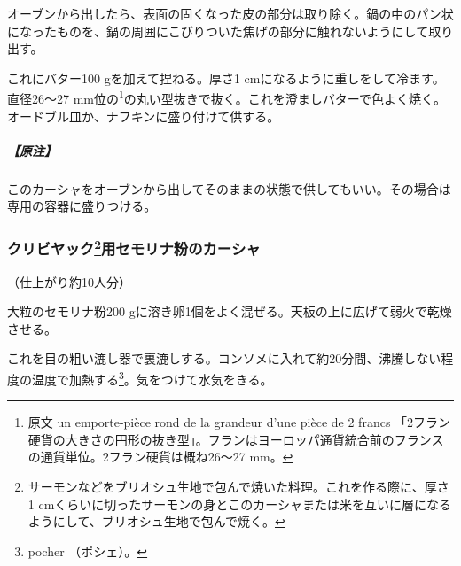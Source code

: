 \begin{recette}
オーブンから出したら、表面の固くなった皮の部分は取り除く。鍋の中のパン状になったものを、鍋の周囲にこびりついた焦げの部分に触れないようにして取り出す。

これにバター100 gを加えて捏ねる。厚さ1
cmになるように重しをして冷ます。直径26〜27 mm位の\footnote{原文 un
  emporte-pièce rond de la grandeur d'une pièce de 2 francs
  「2フラン硬貨の大きさの円形の抜き型」。フランはヨーロッパ通貨統合前のフランスの通貨単位。2フラン硬貨は概ね26〜27
  mm。}の丸い型抜きで抜く。これを澄ましバターで色よく焼く。オードブル皿か、ナフキンに盛り付けて供する。

\hypertarget{nota-kache-de-sarrazin-pour-potage}{%
\subparagraph{【原注】}\label{nota-kache-de-sarrazin-pour-potage}}

このカーシャをオーブンから出してそのままの状態で供してもいい。その場合は専用の容器に盛りつける。

\atoaki{}

\hypertarget{kache-de-semoule-pour-coulibiac}{%
\subsubsection[クリビヤック用セモリナ粉のカーシャ]{\texorpdfstring{クリビヤック\footnote{サーモンなどをブリオシュ生地で包んで焼いた料理。これを作る際に、厚さ1
  cmくらいに切ったサーモンの身とこのカーシャまたは米を互いに層になるようにして、ブリオシュ生地で包んで焼く。}用セモリナ粉のカーシャ}{クリビヤック用セモリナ粉のカーシャ}}\label{kache-de-semoule-pour-coulibiac}}



（仕上がり約10人分）

大粒のセモリナ粉200
gに溶き卵1個をよく混ぜる。天板の上に広げて弱火で乾燥させる。

これを目の粗い漉し器で裏漉しする。コンソメに入れて約20分間、沸騰しない程度の温度で加熱する\footnote{pocher
  （ポシェ）。}。気をつけて水気をきる。

\atoaki{}

\hypertarget{matignon}{%
}
\end{recette}
